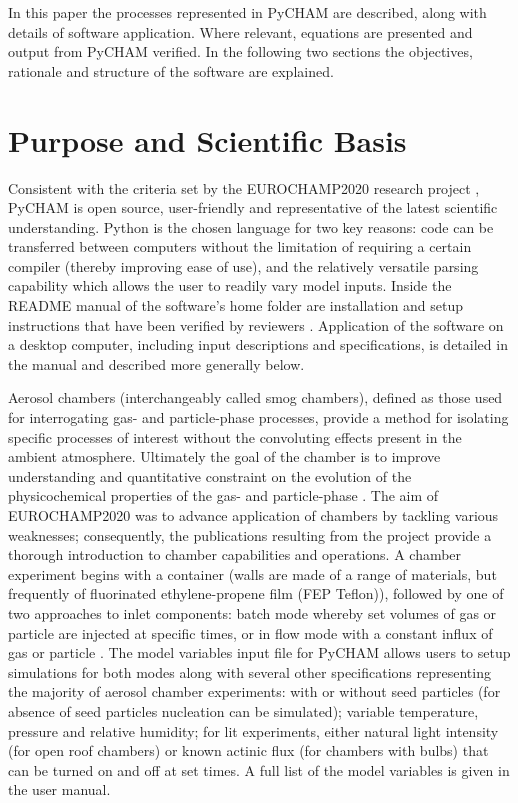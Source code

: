 \documentclass[gmd, manuscript]{copernicus}
\begin{document}
In this paper the processes represented in PyCHAM are described, along with details of software application.  Where relevant, equations are presented and output from PyCHAM verified.  In the following two sections the objectives, rationale and structure of the software are explained.

\section{Purpose and Scientific Basis}\label{sec:purp}

Consistent with the criteria set by the EUROCHAMP2020 research project \citep{EUROCHAMP2020}, PyCHAM is open source, user-friendly and representative of the latest scientific understanding.  Python is the chosen language for two key reasons: code can be transferred between computers without the limitation of requiring a certain compiler (thereby improving ease of use), and the relatively versatile parsing capability which allows the user to readily vary model inputs.  Inside the README manual of the software's home folder are installation and setup instructions that have been verified by reviewers \citep{OMeara2020}.  Application of the software on a desktop computer, including input descriptions and specifications, is detailed in the manual and described more generally below.

Aerosol chambers (interchangeably called smog chambers), defined as those used for interrogating gas- and particle-phase processes, provide a method for isolating specific processes of interest without the convoluting effects present in the ambient atmosphere.  Ultimately the goal of the chamber is to improve understanding and quantitative constraint on the evolution of the physicochemical properties of the gas- and particle-phase \citep{Schwantes2017, Charan2019, Hidy2019}.  The aim of EUROCHAMP2020 was to advance application of chambers by tackling various weaknesses; consequently, the publications \citep{EUROCHAMP2020} resulting from the project provide a thorough introduction to chamber capabilities and operations.  A chamber experiment begins with a container (walls are made of a range of materials, but frequently of fluorinated ethylene-propene film (FEP Teflon)), followed by one of two approaches to inlet components: batch mode whereby set volumes of gas or particle are injected at specific times, or in flow mode with a constant influx of gas or particle \citep{Jaoui2014}.  The model variables input file for PyCHAM allows users to setup simulations for both modes along with several other specifications representing the majority of aerosol chamber experiments: with or without seed particles (for absence of seed particles nucleation can be simulated); variable temperature, pressure and relative humidity; for lit experiments, either natural light intensity (for open roof chambers) or known actinic flux (for chambers with bulbs) that can be turned on and off at set times.  A full list of the model variables is given in the user manual.
\end{document}
